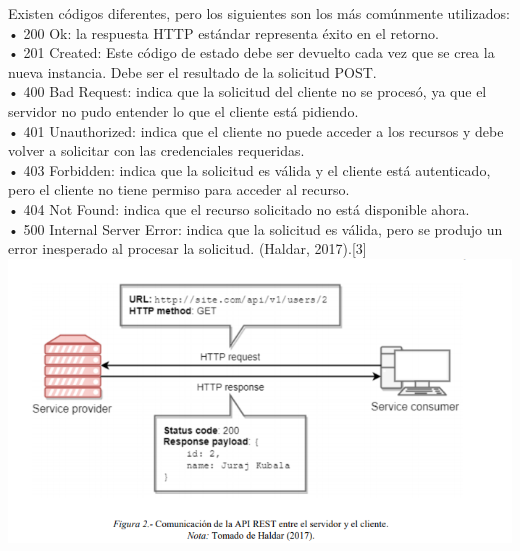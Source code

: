 \documentclass[twocolumn]{article}
\begin{document}
Existen códigos diferentes, pero los siguientes son los más
comúnmente utilizados:
\\• 200 Ok: la respuesta HTTP estándar representa éxito en el retorno.
\\• 201 Created: Este código de estado debe ser devuelto cada vez que se crea la nueva
instancia. Debe ser el resultado de la solicitud POST.
\\• 400 Bad Request: indica que la solicitud del cliente no se procesó, ya que el servidor
no pudo entender lo que el cliente está pidiendo.
\\• 401 Unauthorized: indica que el cliente no puede acceder a los recursos y debe volver
a solicitar con las credenciales requeridas.
\\• 403 Forbidden: indica que la solicitud es válida y el cliente está autenticado, pero el
cliente no tiene permiso para acceder al recurso.
\\• 404 Not Found: indica que el recurso solicitado no está disponible ahora.
\\• 500 Internal Server Error: indica que la solicitud es válida, pero se produjo un error
inesperado al procesar la solicitud. (Haldar, 2017).[3]\\
\includegraphics[width=1.02\linewidth]{img/foto2}
\newpage
\end{document}
